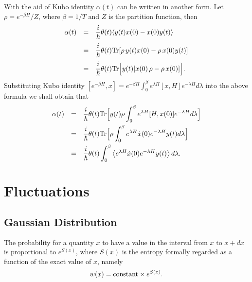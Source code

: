 \documentclass{book}
\newcommand{\average}[1]{\langle#1\rangle}
\newcommand{\Tr}{{\rm Tr}}
\numberwithin{equation}{section}
\begin{document}
With the aid of Kubo identity $\alpha(t)$ can be written in another
form. Let $\rho=e^{-\beta H}/Z$, where $\beta=1/T$ and $Z$ is the
partition function, then
\begin{equation}
  \begin{array}{rcl}
    \alpha(t)&=&\displaystyle\frac{i}{\hbar}\theta(t)
    \average{y(t)x(0)-x(0)y(t)}\\\vbox to 20pt{}
    &=&\displaystyle\frac{i}{\hbar}\theta(t)
    \Tr[\rho\,y(t)x(0)-\rho\,x(0)y(t)]\\\vbox to 20pt{}
    &=&\displaystyle\frac{i}{\hbar}\theta(t)
    \Tr \Bigl[y(t)[x(0)\,\rho-\rho\,x(0)]\Bigr].
  \end{array}
\end{equation}
Substituting Kubo identity $[e^{-\beta H},x]=e^{-\beta H}\int_0^\beta
e^{\lambda H}[x,H]e^{-\lambda H}d\lambda$ into the above formula we
shall obtain that
\begin{equation}
  \begin{array}{rcl}
    \alpha(t)&=&\displaystyle\frac{i}{\hbar}\theta(t)\Tr\Bigl[y(t)\rho
    \int_0^\beta e^{\lambda H}[H,x(0)]e^{-\lambda H}d\lambda\Bigr]\\\vbox to 20pt{}
    &=&\displaystyle\frac{i}{\hbar}\theta(t)\Tr\Bigl[\rho
    \int_0^\beta e^{\lambda H}\dot{x}(0)e^{-\lambda H}y(t)d\lambda\Bigr]
    \\\vbox to 20pt{}
    &=&\displaystyle\frac{i}{\hbar}\theta(t)
    \int_0^\beta\left\langle e^{\lambda H}\dot{x}(0)e^{-\lambda H}
      y(t)\right\rangle d\lambda.
  \end{array}
\end{equation}
  

\chapter{Fluctuations}
\section{Gaussian Distribution}
The probability for a quantity $x$ to have a value in the interval
from $x$ to $x+dx$ is proportional to $e^{S(x)}$, where $S(x)$ is the
entropy formally regarded as a function of the exact value of $x$, namely
\begin{equation}
  w(x)={\rm constant}\times e^{S(x)}.
\end{equation}
\end{document}
